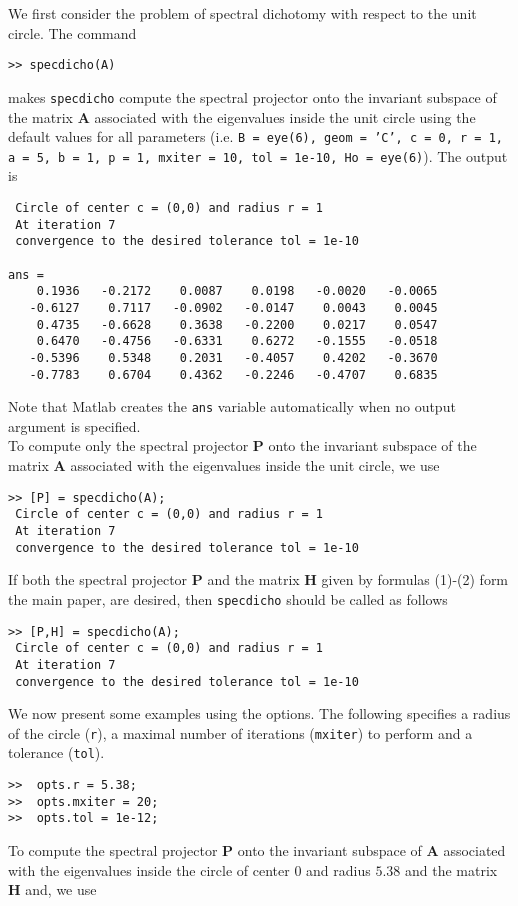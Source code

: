 \documentclass[acmtocl]{acmtrans2m}
\newcommand{\Am}{\mathbf{A}}
\newcommand{\Hm}{\mathbf{H}}
\newcommand{\Pm}{\mathbf{P}}
\begin{document}
We first consider the problem of spectral dichotomy with respect to the unit circle.
The command
\begin{verbatim}
>> specdicho(A)
\end{verbatim}
makes {\tt specdicho} compute the spectral projector onto the invariant subspace of the matrix $\Am$ associated with the eigenvalues inside the unit circle using the default values for all parameters
(i.e. {\tt B = eye(6), geom = 'C', c = 0, r = 1, a = 5, b = 1, p = 1, mxiter = 10, tol = 1e-10, Ho = eye(6)}).
The output is
\begin{verbatim}
 Circle of center c = (0,0) and radius r = 1
 At iteration 7
 convergence to the desired tolerance tol = 1e-10

ans =
    0.1936   -0.2172    0.0087    0.0198   -0.0020   -0.0065
   -0.6127    0.7117   -0.0902   -0.0147    0.0043    0.0045
    0.4735   -0.6628    0.3638   -0.2200    0.0217    0.0547
    0.6470   -0.4756   -0.6331    0.6272   -0.1555   -0.0518
   -0.5396    0.5348    0.2031   -0.4057    0.4202   -0.3670
   -0.7783    0.6704    0.4362   -0.2246   -0.4707    0.6835
\end{verbatim}
Note that {\sc Matlab}  creates the {\tt ans} variable automatically when no output argument is specified.\\
To compute only the spectral projector $\Pm$ onto the invariant subspace of the matrix $\Am$ associated with the eigenvalues inside the unit circle, we use
\begin{verbatim}
>> [P] = specdicho(A);
 Circle of center c = (0,0) and radius r = 1
 At iteration 7
 convergence to the desired tolerance tol = 1e-10
\end{verbatim}
If both the spectral projector $\Pm$ and the matrix  $\Hm$ given by formulas (1)-(2) form the main paper, are desired, then {\tt specdicho} should be called as follows
\begin{verbatim}
>> [P,H] = specdicho(A);
 Circle of center c = (0,0) and radius r = 1
 At iteration 7
 convergence to the desired tolerance tol = 1e-10
\end{verbatim}
We now present some examples using the options.
The following specifies a radius of the circle ({\tt r}), a maximal number of iterations ({\tt mxiter}) to perform and a tolerance ({\tt tol}).
\begin{verbatim}
>>  opts.r = 5.38;
>>  opts.mxiter = 20;
>>  opts.tol = 1e-12;
\end{verbatim}
To compute the spectral projector $\Pm$ onto the invariant subspace of $\Am$ associated with the eigenvalues inside the circle of center $0$ and radius $5.38$ and the matrix  $\Hm$ and, we use
\end{document}
